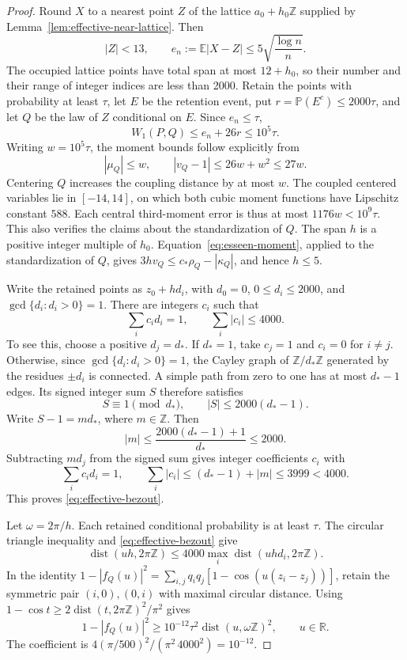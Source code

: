 \documentclass[aop]{imsart}
\theoremstyle{plain}
\theoremstyle{definition}
\theoremstyle{definition}
\newcommand{\PP}{\mathbb P}
\newcommand{\EE}{\mathbb E}
\newcommand{\R}{\mathbb R}
\DeclareMathOperator{\dist}{dist}
\begin{document}
\begin{proof}
Round $X$ to a nearest point $Z$ of the lattice
$a_0+h_0\mathbb Z$ supplied by Lemma~\ref{lem:effective-near-lattice}.
Then
\[
 |Z|<13,\qquad
 e_n:=\EE|X-Z|\le5\sqrt{\frac{\log n}{n}}.
\]
The occupied lattice points have total span at most $12+h_0$,
so their number and their range of integer indices are less than 2000.
Retain the points with probability at least $\tau$, let $E$ be the
retention event, put $r=\PP(E^c)\le2000\tau$, and let $Q$ be the
law of $Z$ conditional on $E$.  Since $e_n\le\tau$,
\[
 W_1(P,Q)\le e_n+26r\le10^5\tau.
\]
Writing $w=10^5\tau$, the moment bounds follow explicitly from
\[
 |\mu_Q|\le w,\qquad |v_Q-1|\le26w+w^2\le27w.
\]
Centering $Q$ increases the coupling distance by at most $w$.
The coupled centered variables lie in $[-14,14]$, on which both
cubic moment functions have Lipschitz constant $588$.
Each central third-moment error is thus at most $1176w<10^9\tau$.
This also verifies the claims about the standardization of $Q$.
The span $h$ is a positive integer multiple of $h_0$.
Equation~\eqref{eq:esseen-moment}, applied to the standardization
of $Q$, gives $3hv_Q\le c_*\rho_Q-|\kappa_Q|$, and hence $h\le5$.

Write the retained points as $z_0+hd_i$, with $d_0=0$,
$0\le d_i\le2000$, and $\gcd\{d_i:d_i>0\}=1$.
There are integers $c_i$ such that
\begin{equation}\label{eq:effective-bezout}
 \sum_i c_i d_i=1,\qquad \sum_i|c_i|\le4000.
\end{equation}
To see this, choose a positive $d_j=d_*$. If $d_*=1$,
take $c_j=1$ and $c_i=0$ for $i\ne j$.
Otherwise, since $\gcd\{d_i:d_i>0\}=1$, the Cayley graph of
$\mathbb Z/d_*\mathbb Z$ generated by the residues $\pm d_i$
is connected. A simple path from zero to one has at most
$d_*-1$ edges. Its signed integer sum $S$ therefore satisfies
\[
 S\equiv1\pmod{d_*},\qquad |S|\le2000(d_*-1).
\]
Write $S-1=md_*$, where $m\in\mathbb Z$. Then
\[
 |m|\le\frac{2000(d_*-1)+1}{d_*}\le2000.
\]
Subtracting $md_j$ from the signed sum gives integer coefficients
$c_i$ with
\[
 \sum_i c_i d_i=1,\qquad
 \sum_i|c_i|\le(d_*-1)+|m|\le3999<4000.
\]
This proves \eqref{eq:effective-bezout}.

Let $\omega=2\pi/h$.  Each retained conditional probability is at
least $\tau$.  The circular triangle inequality and
\eqref{eq:effective-bezout} give
\[
 \dist(uh,2\pi\mathbb Z)
 \le4000\max_i\dist(uhd_i,2\pi\mathbb Z).
\]
In the identity
$1-|f_Q(u)|^2=\sum_{i,j}q_iq_j[1-\cos(u(z_i-z_j))]$,
retain the symmetric pair $(i,0),(0,i)$ with maximal circular
distance.  Using $1-\cos t\ge2\dist(t,2\pi\mathbb Z)^2/\pi^2$
gives
\begin{equation}\label{eq:effective-spectral-gap}
 1-|f_Q(u)|^2\ge10^{-12}\tau^2\dist(u,\omega\mathbb Z)^2,
 \qquad u\in\R.
\end{equation}
The coefficient is
$4(\pi/500)^2/(\pi^2\,4000^2)=10^{-12}$.


\end{proof}
\end{document}
